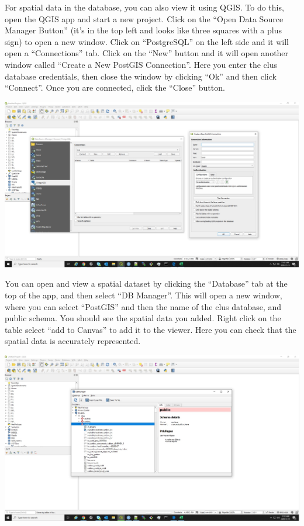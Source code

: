 \documentclass[
]{article}
\begin{document}
For spatial data in the database, you can also view it using QGIS. To do
this, open the QGIS app and start a new project. Click on the ``Open
Data Source Manager Button'' (it's in the top left and looks like three
squares with a plus sign) to open a new window. Click on ``PostgreSQL''
on the left side and it will open a ``Connections'' tab. Click on the
``New'' button and it will open another window called ``Create a New
PostGIS Connection''. Here you enter the clus database credentials, then
close the window by clicking ``Ok'' and then click ``Connect''. Once you
are connected, click the ``Close'' button.

\includegraphics{images/qgis.jpg}

You can open and view a spatial dataset by clicking the ``Database'' tab
at the top of the app, and then select ``DB Manager''. This will open a
new window, where you can select ``PostGIS'' and then the name of the
clus database, and public schema. You should see the spatial data you
added. Right click on the table select ``add to Canvas'' to add it to
the viewer. Here you can check that the spatial data is accurately
represented.

\includegraphics{images/qgis2.jpg}
\end{document}
